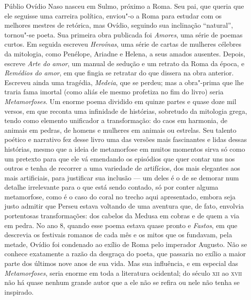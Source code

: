 Públio Ovídio Naso nasceu em Sulmo, próximo a Roma. Seu pai, que queria
que ele seguisse uma carreira política, enviou"-o a Roma para estudar
com os melhores mestres de retórica, mas Ovídio, seguindo sua inclinação “natural”,  tornou"-se poeta. 
Sua primeira obra publicada foi \textit{Amores}, uma série de poemas curtos. 
Em seguida escreveu \textit{Heroínas}, uma série
de cartas de mulheres célebres da mitologia, como Penélope,
Ariadne e Helena, a seus amados ausentes. Depois, escreve \textit{Arte
do amor}, um manual de sedução e um retrato da Roma da época, e
\textit{Remédios do amor}, em que fingia se retratar do que
dissera na obra anterior. Escreveu ainda uma tragédia, \textit{Medeia}, que se
perdeu; mas a obra"-prima que lhe traria fama imortal (como aliás ele
mesmo profetiza no fim do livro) seria \textit{Metamorfoses}. Um enorme poema
dividido em quinze partes e quase doze mil versos, em que reconta uma infinidade
de histórias, sobretudo da mitologia grega, tendo como elemento
unificador a transformação: do caos em harmonia, de animais em
pedras, de homens e mulheres em animais ou estrelas. Seu talento 
poético e narrativo fez desse livro uma das versões
mais fascinantes e lidas dessas histórias, mesmo que a ideia de
metamorfose em muitos momentos sirva só como um pretexto para que ele
vá emendando os episódios que quer contar uns nos outros e tenha de
recorrer a uma variedade de artifícios, dos mais elegantes aos mais
artificiais, para justificar sua inclusão --- um deles é o de se demorar
num detalhe irrelevante para o que está sendo contado, só por conter
alguma metamorfose, como é o caso do coral no trecho aqui apresentado,
embora seja justo admitir que Perseu estava voltando de uma aventura
que, de fato, envolvia portentosas transformações: dos cabelos da
Medusa em cobras e de quem a via em pedra. No ano 8, quando esse
poema estava quase pronto e \textit{Fastos}, em que descrevia os
festivais romanos de cada mês e os mitos que os fundavam, pela
metade, Ovídio foi condenado ao exílio de Roma pelo imperador Augusto. Não se conhece
exatamente a razão da desgraça do poeta, que passaria no exílio a maior parte dos
últimos nove anos de sua vida. Mas
sua influência, e em especial das \textit{Metamorfoses}, seria enorme em toda
a literatura ocidental; do século \textsc{xii} ao \textsc{xvii} não há quase nenhum
grande autor que a ele não se refira ou nele não tenha se inspirado. 

\chapter*{\ }

